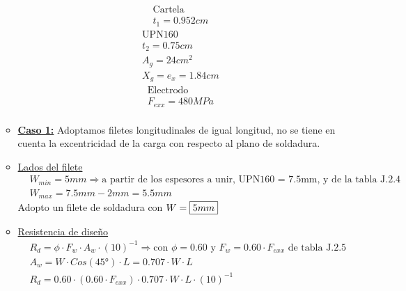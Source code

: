 \begin{enumerate}
\begin{itemize}
\begin{align*}
& \text{Cartela}\\
& t_1 = 0.952 cm
\end{align*}
\begin{align*}
& \text{UPN160}\\
& t_2 = 0.75 cm \\
& A_g = 24 cm^2 \\
& X_g = e_x = 1.84 cm
\end{align*}
\begin{align*}
& \text{Electrodo}\\
& F_{exx} = 480MPa\\
\end{align*}
\newpage
\item \underline{\textbf{Caso 1:}}
Adoptamos filetes longitudinales de igual longitud, no se tiene en cuenta la excentricidad de la carga con respecto al plano de soldadura.\\
\item \underline{Lados del filete}
\begin{align*}
& W_{min} = 5mm \Rightarrow \text{a partir de los espesores a unir, UPN160 = 7.5mm, y de la tabla J.2.4}\\
& W_{max} = 7.5mm - 2mm = 5.5mm
\end{align*}
Adopto un filete de soldadura con $W = \framebox{$5 mm$}$\\

\item \underline{Resistencia de diseño}
\begin{align*}
& R_d = \phi \cdot F_w \cdot A_w \cdot (10)^{-1} \Rightarrow \text{con $\phi = 0.60$ y $F_w = 0.60 \cdot F_{exx}$ de tabla J.2.5}\\
& A_w = W \cdot Cos(45\text{°}) \cdot L = 0.707 \cdot W \cdot L \\
& R_d = 0.60 \cdot (0.60 \cdot F_{exx}) \cdot 0.707 \cdot W \cdot L \cdot (10)^{-1}
\end{align*}


\end{itemize}
\end{enumerate}
